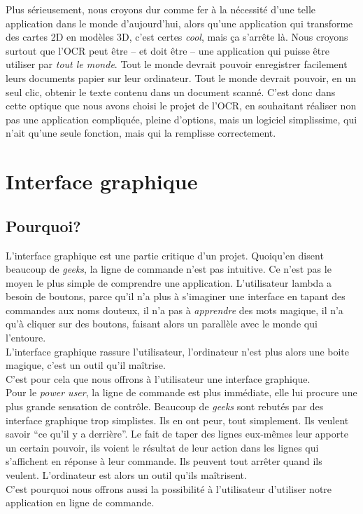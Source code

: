 \documentclass[a4paper,10pt]{report}
\begin{document}
Plus sérieusement, nous croyons dur comme fer à la nécessité d’une telle application dans le monde d’aujourd’hui, alors qu’une application qui transforme des cartes 2D en modèles 3D, c’est certes \emph{cool}, mais ça s’arrête là. Nous croyons surtout que l’OCR peut être – et doit être – une application qui puisse être utiliser par \emph{tout le monde}. Tout le monde devrait pouvoir enregistrer facilement leurs documents papier sur leur ordinateur. Tout le monde devrait pouvoir, en un seul clic, obtenir le texte contenu dans un document scanné. C’est donc dans cette optique que nous avons choisi le projet de l’OCR, en souhaitant réaliser non pas une application compliquée, pleine d’options, mais un logiciel simplissime, qui n’ait qu’une seule fonction, mais qui la remplisse correctement.



\chapter{Interface graphique} %
\label{cha:interface_graphique}

\section{Pourquoi?} %
\label{sec:pourquoi_}
L’interface graphique est une partie critique d’un projet. Quoiqu’en disent beaucoup de \emph{geeks}, la ligne de commande n’est pas intuitive. Ce n’est pas le moyen le plus simple de comprendre une application. L’utilisateur lambda a besoin de boutons, parce qu’il n’a plus à s’imaginer une interface en tapant des commandes aux noms douteux, il n’a pas à \emph{apprendre} des mots magique, il n’a qu’à cliquer sur des boutons, faisant alors un parallèle avec le monde qui l’entoure. \\
L’interface graphique rassure l’utilisateur, l’ordinateur n’est plus alors une boite magique, c’est un outil qu’il maîtrise. \\
C’est pour cela que nous offrons à l’utilisateur une interface graphique.\\

Pour le \emph{power user}, la ligne de commande est plus immédiate, elle lui procure une plus grande sensation de contrôle. Beaucoup de \emph{geeks} sont rebutés par des interface graphique trop simplistes. Ils en ont peur, tout simplement. Ils veulent savoir ``ce qu’il y a derrière''. Le fait de taper des lignes eux-mêmes leur apporte un certain pouvoir, ils voient le résultat de leur action dans les lignes qui s’affichent en réponse à leur commande. Ils peuvent tout arrêter quand ils veulent. L’ordinateur est alors un outil qu’ils maîtrisent. \\
C’est pourquoi nous offrons aussi la possibilité à l’utilisateur d’utiliser notre application en ligne de commande.
\end{document}
